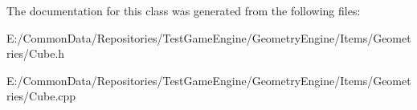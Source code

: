The documentation for this class was generated from the following files\+:\begin{DoxyCompactItemize}
\item 
E\+:/\+Common\+Data/\+Repositories/\+Test\+Game\+Engine/\+Geometry\+Engine/\+Items/\+Geometries/Cube.\+h\item 
E\+:/\+Common\+Data/\+Repositories/\+Test\+Game\+Engine/\+Geometry\+Engine/\+Items/\+Geometries/Cube.\+cpp\end{DoxyCompactItemize}
